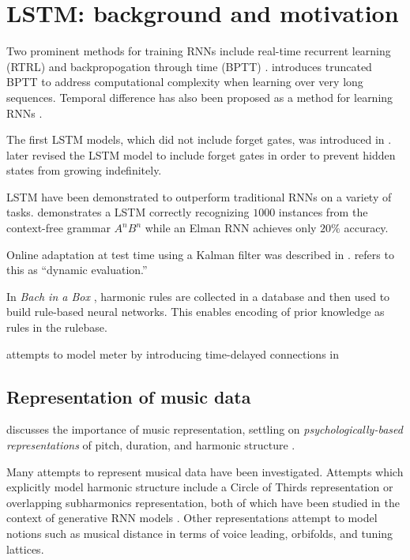\section{LSTM: background and motivation}

Two prominent methods for training RNNs include real-time recurrent learning (RTRL)
\cite{robinson1987utility} and backpropogation through time (BPTT) \cite{williams1995gradient}.
\cite{williams1990efficient} introduces truncated BPTT to address computational complexity
when learning over very long sequences. Temporal difference \cite{sutton1998reinforcement} has
also been proposed as a method for learning RNNs \cite{franklin2004predicting}.

The first LSTM models, which did not include forget gates, was introduced in
\cite{hochreiter1997long}. \cite{gers2000learning} later revised the LSTM model
to include forget gates in order to prevent hidden states from growing
indefinitely.

LSTM have been demonstrated to outperform traditional RNNs on a variety of
tasks. \cite{gers2001lstm} demonstrates a LSTM correctly recognizing $1000$
instances from the context-free grammar $A^n B^n$ while an Elman RNN achieves
only $20\%$ accuracy.

Online adaptation at test time using a Kalman filter was described in \cite{gers2002dekf}.
\cite{Mikolov2010} \cite{Mikolov2012} refers to this as ``dynamic evaluation.''

In \emph{Bach in a Box} \cite{spangler1998bach},
harmonic rules are collected in a database and then used to build rule-based
neural networks. This enables encoding of prior knowledge as rules in the
rulebase.

\cite{eck2008learning} attempts to model meter by introducing time-delayed
connections in \cite{Eck2002}

\subsection{Representation of music data}

\cite{mozer1994neural} discusses the importance of music representation,
settling on \emph{psychologically-based representations} of pitch, duration,
and harmonic structure \cite{shepard1982geometrical}.

Many attempts to represent musical data have been investigated. Attempts which
explicitly model harmonic structure include a Circle of Thirds representation
\cite{franklin2004recurrent} or overlapping subharmonics
representation\cite{laden1989representation}, both of which have been studied
in the context of generative RNN models \cite{franklin2004recurrent}
\cite{mozer1994neural}. Other representations attempt to model notions such as
musical distance in terms of voice leading, orbifolds, and tuning
lattices\cite{Tymoczko2009}.

